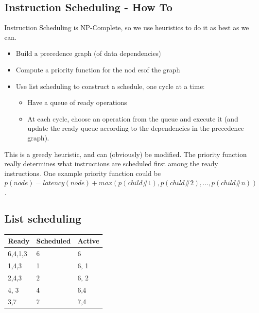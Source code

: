 
\subsection{Instruction Scheduling - How To}

Instruction Scheduling is NP-Complete, so we use heuristics to do it as best as we can.

\begin{itemize}
        \item Build a precedence graph (of data dependencies)
        \item Compute a priority function for the nod esof the graph
        \item Use list scheduling to construct a schedule, one cycle at a time:
        \begin{itemize}
        \item Have a queue of ready operations
        \item At each cycle, choose an operation from the queue and execute
        it (and update the ready queue according to the dependencies in the precedence graph).
        \end{itemize}
\end{itemize}

This is a greedy heuristic, and can (obviously) be modified. The
priority function really determines what instructions are scheduled
first among the ready instructions. One example priority function
could be $p(node) = latency(node) + max(p(child\#1), p(child\#2),
\dots, p(child\#n))$.


\subsection{List scheduling}


\begin{tabular}{lll}
Ready & Scheduled & Active\\ \hline
6,4,1,3 & 6 & 6\\ \hline
1,4,3 & 1 & 6, 1\\ \hline
2,4,3 & 2 & 6, 2\\ \hline
4, 3 & 4 & 6,4\\ \hline
3,7 & 7 & 7,4 \\ \hline
\end{tabular}

